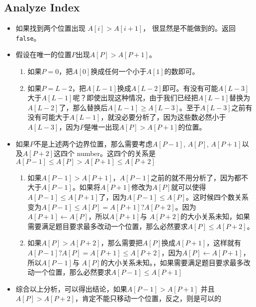 \subsection{Analyze Index}
\begin{itemize}
\item 如果找到两个位置出现 $A[i] > A[i+1]$， 很显然是不能做到的。返回\texttt{false}。
\item 假设在唯一的位置$P$出现$A[P] > A[P+1]$。
\begin{enumerate}
\item 如果$P=0$，把$A[0]$换成任何一个小于$A[1]$的数即可。
\item 如果$P=L-2$，把$A[L-1]$换成$A[L-2]$即可。有没有可能$A[L-3]$大于$A[L-1]$呢？即使出现这种情况，由于我们已经把$A[L-1]$替换为$A[L-2]$了，那么替换后$A[L-1] \geq A[L-3]$。至于$A[L-3]$之前有没有可能大于$A[L-1]$，就没必要分析了，因为这些数必然小于$A[L-3]$，因为$P$是唯一出现$A[P] > A[P+1]$的位置。
\end{enumerate}
\item 如果$P$不是上述两个边界位置，那么需要考虑$A[P-1]$, $A[P]$, $A[P+1]$以及$A[P+2]$这四个 number。这四个的关系是$A[P-1] \leq A[P] > A[P+1] \leq A[P+2]$
\begin{enumerate}
\item 如果$A[P-1] > A[P+1]$，$A[P-1]$之前的就不用分析了，因为都不大于$A[P-1]$。如果将$A[P+1]$修改为$A[P]$就可以使得$A[P-1] \leq A[P+1]$了，因为$A[P-1]\leq A[P]$。这时候四个数关系变为$A[P-1] \leq A[P] = A[P+1] ? A[P+2]$。因为$A[P+1] \gets A[P]$，所以$A[P+1]$与 $A[P+2]$的大小关系未知，如果需要满足题目要求最多改动一个位置，那么必然要求$A[P] \leq A[P+2]$。
\item 如果$A[P] > A[P+2]$，那么需要把$A[P]$换成$A[P+1]$，这样就有$A[P-1] ? A[P] = A[P+1] \leq A[P+2]$，因为$A[P] \gets A[P+1]$， 所以$A[P-1]$与 $A[P]$的大小关系未知。，如果需要满足题目要求最多改动一个位置，那么必然要求$A[P-1] \leq A[P+1]$
\end{enumerate}
\item 综合以上分析，可以得出结论，如果$A[P-1] > A[P+1]$ 并且 $A[P] > A[P+2]$，肯定不能只移动一个位置，反之，则是可以的
\end{itemize}